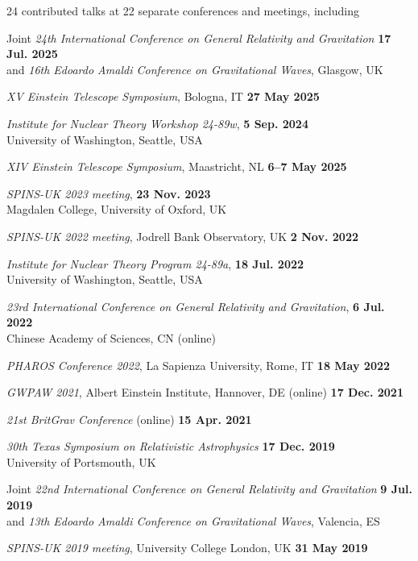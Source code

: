 24 contributed talks at 22 separate conferences and meetings, including

\begin{etaremune}
    \item Joint \textit{24th International Conference on General Relativity and
    Gravitation} \hfill \textbf{17 Jul. 2025} \\
    and \textit{16th Edoardo Amaldi Conference on Gravitational Waves}, Glasgow, UK
    \item \textit{XV Einstein Telescope Symposium}, Bologna, IT
    \hfill \textbf{27 May 2025}
    \item \textit{Institute for Nuclear Theory Workshop 24-89w},
    \hfill \textbf{5 Sep. 2024} \\
    University of Washington, Seattle, USA
    \item \textit{XIV Einstein Telescope Symposium}, Maastricht, NL
    \hfill \textbf{6--7 May 2025}
    \item \textit{SPINS-UK 2023 meeting}, \hfill \textbf{23 Nov. 2023} \\
    Magdalen College, University of Oxford, UK
    \item \textit{SPINS-UK 2022 meeting}, Jodrell Bank Observatory, UK
    \hfill \textbf{2 Nov. 2022}
    \item \textit{Institute for Nuclear Theory Program 24-89a},
    \hfill \textbf{18 Jul. 2022} \\
    University of Washington, Seattle, USA
    \item \textit{23rd International Conference on General Relativity and
    Gravitation}, \hfill \textbf{6 Jul. 2022} \\
    Chinese Academy of Sciences, CN (online)
    \item \textit{PHAROS Conference 2022}, La Sapienza University, Rome, IT
    \hfill \textbf{18 May 2022}
    \item \textit{GWPAW 2021}, Albert Einstein Institute, Hannover, DE (online)
    \hfill \textbf{17 Dec. 2021}
    \item \textit{21st BritGrav Conference} (online)
    \hfill \textbf{15 Apr. 2021}
    \item \textit{30th Texas Symposium on Relativistic Astrophysics}
    \hfill \textbf{17 Dec. 2019} \\
    University of Portsmouth, UK
    \item Joint \textit{22nd International Conference on General Relativity and
    Gravitation} \hfill \textbf{9 Jul. 2019} \\
    and \textit{13th Edoardo Amaldi Conference on Gravitational Waves},
    Valencia, ES
    \item \textit{SPINS-UK 2019 meeting}, University College London, UK
    \hfill \textbf{31 May 2019}
\end{etaremune}


